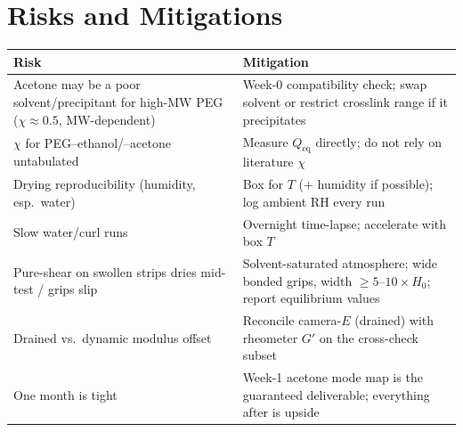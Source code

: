 \documentclass[12pt,letterpaper]{article}
\newcommand{\Emod}{E}
\newcommand{\chiFH}{\chi}
\begin{document}
\section{Risks and Mitigations}
\begin{center}\small
\begin{tabular}{@{}p{6.6cm}p{8.4cm}@{}}
\toprule
Risk & Mitigation \\
\midrule
Acetone may be a poor solvent/precipitant for high-MW PEG ($\chiFH\!\approx\!0.5$,
MW-dependent) & Week-0 compatibility check; swap solvent or restrict crosslink
range if it precipitates \\
$\chiFH$ for PEG--ethanol/--acetone untabulated & Measure $Q_{\mathrm{eq}}$
directly; do not rely on literature $\chiFH$ \\
Drying reproducibility (humidity, esp.\ water) & Box for $T$ ($+$ humidity if
possible); log ambient RH every run \\
Slow water/curl runs & Overnight time-lapse; accelerate with box $T$ \\
Pure-shear on swollen strips dries mid-test / grips slip & Solvent-saturated
atmosphere; wide bonded grips, width $\ge 5$--$10\times H_0$; report equilibrium
values \\
Drained vs.\ dynamic modulus offset & Reconcile camera-$\Emod$ (drained) with
rheometer $G'$ on the cross-check subset \\
One month is tight & Week-1 acetone mode map is the guaranteed deliverable;
everything after is upside \\
\bottomrule
\end{tabular}
\end{center}

\end{document}
